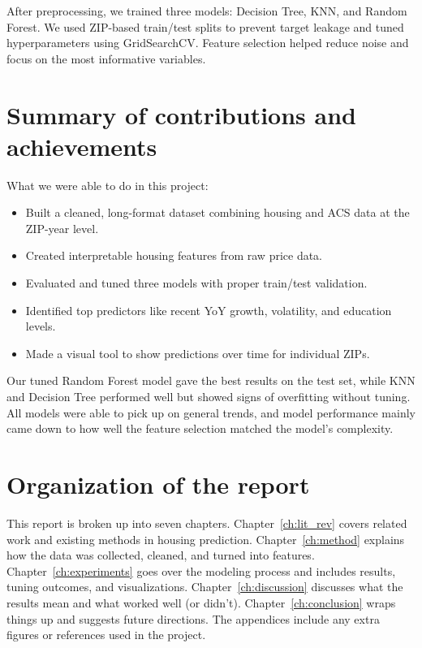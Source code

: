 After preprocessing, we trained three models: Decision Tree, KNN, and Random Forest. We used ZIP-based train/test splits to prevent target leakage and tuned hyperparameters using GridSearchCV. Feature selection helped reduce noise and focus on the most informative variables.

\section{Summary of contributions and achievements}
\label{sec:intro_sum_results}

What we were able to do in this project:
\begin{itemize}
    \item Built a cleaned, long-format dataset combining housing and ACS data at the ZIP-year level.
    \item Created interpretable housing features from raw price data.
    \item Evaluated and tuned three models with proper train/test validation.
    \item Identified top predictors like recent YoY growth, volatility, and education levels.
    \item Made a visual tool to show predictions over time for individual ZIPs.
\end{itemize}

Our tuned Random Forest model gave the best results on the test set, while KNN and Decision Tree performed well but showed signs of overfitting without tuning. All models were able to pick up on general trends, and model performance mainly came down to how well the feature selection matched the model’s complexity.

\section{Organization of the report}
\label{sec:intro_org}

This report is broken up into seven chapters. Chapter~\ref{ch:lit_rev} covers related work and existing methods in housing prediction. Chapter~\ref{ch:method} explains how the data was collected, cleaned, and turned into features. Chapter~\ref{ch:experiments} goes over the modeling process and includes results, tuning outcomes, and visualizations. Chapter~\ref{ch:discussion} discusses what the results mean and what worked well (or didn’t). Chapter~\ref{ch:conclusion} wraps things up and suggests future directions. The appendices include any extra figures or references used in the project.
